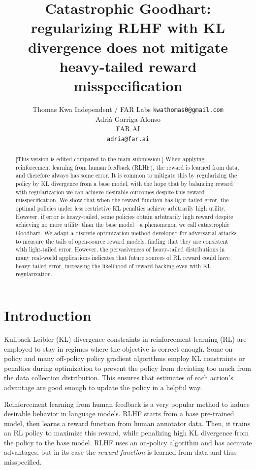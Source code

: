 \documentclass{article}
\title{Catastrophic Goodhart: regularizing RLHF with KL divergence does not mitigate heavy-tailed reward misspecification}
\author{%
  Thomas Kwa
  Independent / FAR Labs
  \texttt{kwathomas0@gmail.com} \\
  \And
  Adrià Garriga-Alonso \\
  FAR AI \\
  \texttt{adria@far.ai} \\
}
\begin{document}
\maketitle

 \begin{abstract}
  [This version is edited compared to the main submission.] When applying reinforcement learning from human feedback (RLHF), the reward is learned from data, and therefore always has some error. It is common to mitigate this by regularizing the policy by KL divergence from a base model, with the hope that by balancing reward with regularization we can achieve desirable outcomes despite this reward misspecification. We show that when the reward function has light-tailed error, the optimal policies under less restrictive KL penalties achieve arbitrarily high utility. However, if error is heavy-tailed, some policies obtain arbitrarily high reward despite achieving no more utility than the base model—a phenomenon we call catastrophic Goodhart. We adapt a discrete optimization method developed for adversarial attacks to measure the tails of open-source reward models, finding that they are consistent with light-tailed error. However, the pervasiveness of heavy-tailed distributions in many real-world applications indicates that future sources of RL reward could have heavy-tailed error, increasing the likelihood of reward hacking even with KL regularization.
\end{abstract}

\section{Introduction}

Kullback-Leibler (KL) divergence constraints in reinforcement learning (RL) are employed to stay in regimes where the objective is correct enough.
Some on-policy \citep{trpo,ppo} and many off-policy \citep{abdolmaleki18mpo,jaques2019way} policy gradient algorithms employ KL constraints or penalties during optimization to prevent the policy from deviating too much from the data collection distribution. This ensures that estimates of each action's advantage are good enough to update the policy in a helpful way.

Reinforcement learning from human feedback \citep[RLHF]{rlhf_christiano,ziegler2020finetuning} is a very popular method to induce desirable behavior in language models. RLHF starts from a base pre-trained model, then learns a reward function from human annotator data. Then, it trains an RL policy to maximize this reward, while penalizing high KL divergence from the policy to the base model. RLHF uses an on-policy algorithm and has accurate advantages, but in its case the \emph{reward function} is learned from data and thus misspecified.
\end{document}
